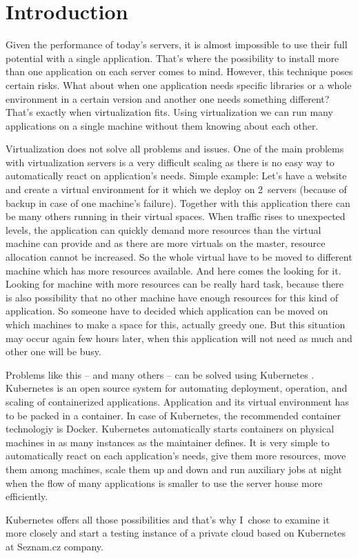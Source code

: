 \chapter{Introduction}

Given the performance of today’s servers, it is almost impossible to use their full potential with a single application. That’s where the possibility to install more than one application on each server comes to mind. However, this technique poses certain risks. What about when one application needs specific libraries or a whole environment in a certain version and another one needs something different? That’s exactly when virtualization fits. Using virtualization we can run many applications on a single machine without them knowing about each other.

Virtualization does not solve all problems and issues. One of the main problems with virtualization servers is a very difficult scaling as there is no easy way to automatically react on application’s needs. Simple example: Let’s have a website and create a virtual environment for it which we deploy on 2~servers (because of backup in case of one machine’s failure). Together with this application there can be many others running in their virtual spaces. When traffic rises to unexpected levels,  the application can quickly demand more resources than the virtual machine can provide and as there are more virtuals on the master, resource allocation cannot be increased. So the whole virtual have to be moved to different machine which has more resources available. And here comes the looking for it. Looking for machine with more resources can be really hard task, because there is also possibility that no other machine have enough resources for this kind of application. So someone have to decided which application can be moved on which machines to make a space for this, actually greedy one. But this situation may occur again few hours later, when this application will not need as much and other one will be busy.

Problems like this -- and many others -- can be solved using Kubernetes \cite{kubernetesio}. Kubernetes is an open source system for automating deployment, operation, and scaling of containerized applications. Application and its virtual environment has to be packed in a container. In case of Kubernetes, the recommended container technologiy is Docker. Kubernetes automatically starts containers on physical machines in as many instances as the maintainer defines. It is very simple to automatically react on each application’s needs, give them more resources, move them among machines, scale them up and down and run auxiliary jobs at night when the flow of many applications is smaller to use the server house more efficiently.

Kubernetes offers all those possibilities and that’s why I~chose to examine it more closely and start a testing instance of a private cloud based on Kubernetes at Seznam.cz company.
